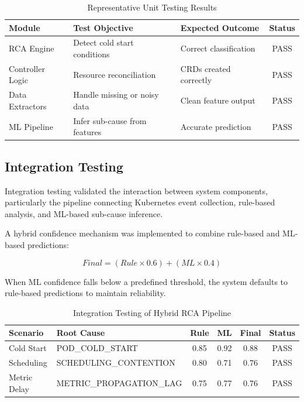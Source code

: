\begin{table}[H]
\centering
\small
\begin{tabularx}{\textwidth}{|l|X|l|c|}
\hline
\textbf{Module} & \textbf{Test Objective} & \textbf{Expected Outcome} & \textbf{Status} \\ \hline
RCA Engine & Detect cold start conditions & Correct classification & PASS \\ \hline
Controller Logic & Resource reconciliation & CRDs created correctly & PASS \\ \hline
Data Extractors & Handle missing or noisy data & Clean feature output & PASS \\ \hline
ML Pipeline & Infer sub-cause from features & Accurate prediction & PASS \\ \hline
\end{tabularx}
\caption{Representative Unit Testing Results}
\label{tab:unit_tests_sample}
\end{table}

\subsection{Integration Testing}
Integration testing validated the interaction between system components, particularly the pipeline connecting Kubernetes event collection, rule-based analysis, and ML-based sub-cause inference.

A hybrid confidence mechanism was implemented to combine rule-based and ML-based predictions:

\[
Final = (Rule \times 0.6) + (ML \times 0.4)
\]

When ML confidence falls below a predefined threshold, the system defaults to rule-based predictions to maintain reliability.

\begin{table}[H]
\centering
\small
\begin{tabularx}{\textwidth}{|l|X|c|c|c|c|}
\hline
\textbf{Scenario} & \textbf{Root Cause} & \textbf{Rule} & \textbf{ML} & \textbf{Final} & \textbf{Status} \\ \hline
Cold Start & POD\_COLD\_START & 0.85 & 0.92 & 0.88 & PASS \\ \hline
Scheduling & SCHEDULING\_CONTENTION & 0.80 & 0.71 & 0.76 & PASS \\ \hline
Metric Delay & METRIC\_PROPAGATION\_LAG & 0.75 & 0.77 & 0.76 & PASS \\ \hline
\end{tabularx}
\caption{Integration Testing of Hybrid RCA Pipeline}
\label{tab:integration_tests}
\end{table}

